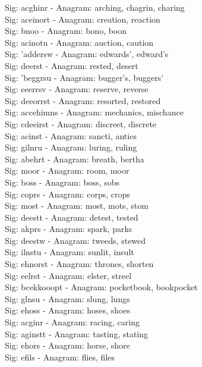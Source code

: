 Sig: {acghinr} - Anagram: arching, chagrin, charing \\
Sig: {aceinort} - Anagram: creation, reaction \\
Sig: {bnoo} - Anagram: bono, boon \\
Sig: {acinotu} - Anagram: auction, caution \\
Sig: {'addersw} - Anagram: edwards', edward's \\
Sig: {deerst} - Anagram: rested, desert \\
Sig: {'beggrsu} - Anagram: bugger's, buggers' \\
Sig: {eeerrsv} - Anagram: reserve, reverse \\
Sig: {deeorrst} - Anagram: resorted, restored \\
Sig: {accehimns} - Anagram: mechanics, mischance \\
Sig: {cdeeirst} - Anagram: discreet, discrete \\
Sig: {acinst} - Anagram: sancti, antics \\
Sig: {gilnru} - Anagram: luring, ruling \\
Sig: {abehrt} - Anagram: breath, bertha \\
Sig: {moor} - Anagram: room, moor \\
Sig: {boss} - Anagram: boss, sobs \\
Sig: {coprs} - Anagram: corps, crops \\
Sig: {most} - Anagram: most, mots, stom \\
Sig: {deestt} - Anagram: detest, tested \\
Sig: {akprs} - Anagram: spark, parks \\
Sig: {deestw} - Anagram: tweeds, stewed \\
Sig: {ilnstu} - Anagram: sunlit, insult \\
Sig: {ehnorst} - Anagram: thrones, shorten \\
Sig: {eelrst} - Anagram: elster, streel \\
Sig: {bcekkooopt} - Anagram: pocketbook, bookpocket \\
Sig: {glnsu} - Anagram: slung, lungs \\
Sig: {ehoss} - Anagram: hoses, shoes \\
Sig: {acginr} - Anagram: racing, caring \\
Sig: {aginstt} - Anagram: tasting, stating \\
Sig: {ehors} - Anagram: horse, shore \\
Sig: {efils} - Anagram: flies, files \\
